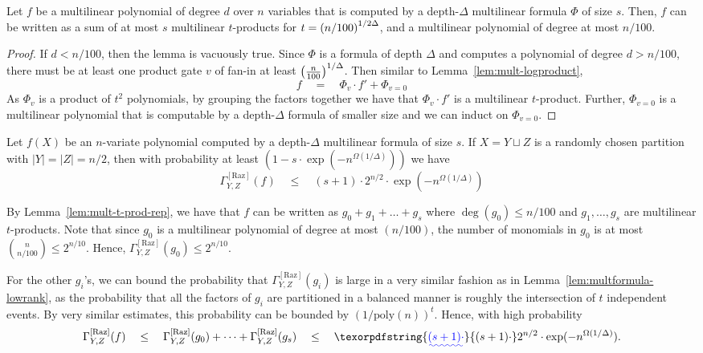 \documentclass{birkjour}
\newcommand{\CM}[1]{\Gamma^{\mathrm{[#1]}}}
\newcommand{\spaced}[1]{\quad#1\quad}
\providecommand{\DIFaddtex}[1]{{\protect\color{blue}\uwave{#1}}} %
\providecommand{\DIFdeltex}[1]{{\protect\color{red}\sout{#1}}}                      %
\providecommand{\DIFaddbegin}{} %
\providecommand{\DIFaddend}{} %
\providecommand{\DIFdelbegin}{} %
\providecommand{\DIFdelend}{} %
\providecommand{\DIFadd}[1]{\texorpdfstring{\DIFaddtex{#1}}{#1}} %
\providecommand{\DIFdel}[1]{\texorpdfstring{\DIFdeltex{#1}}{}} %
\begin{document}
\begin{lemma}\label{lem:mult-t-prod-rep}
Let $f$ be a multilinear polynomial of degree $d$ over $n$ variables that is computed by a depth-$\Delta$ multilinear formula $\Phi$ of size $s$. Then, $f$ can be written as a sum of at most $s$ multilinear $t$-products for $t = \left(n/100\right)^{1/2\Delta}$, and a multilinear polynomial of degree at most $n/100$.  
\end{lemma}
\begin{proof}
If $d < n/100$, then the lemma is vacuously true. Since $\Phi$ is a formula of depth $\Delta$ and computes a polynomial of degree $d > n/100$, there must be at least one product gate $v$ of fan-in at least \DIFdelbegin \DIFdel{$\left(\frac{n}{100}\right)^{1/\Delta}$}\DIFdelend \DIFaddbegin \DIFadd{$\inparen{\frac{n}{100}}^{1/\Delta} = t^2$}\DIFaddend . Then similar to Lemma~\ref{lem:mult-logproduct}, 
$$
f \quad=\quad \Phi_v \cdot f'  + \Phi_{v=0}
$$
As $\Phi_v$ is a product of $t^2$ polynomials, by grouping the factors together we have that $\Phi_v \cdot f'$ is a multilinear $t$-product. Further, $\Phi_{v=0}$ is a multilinear polynomial that is computable by a depth-$\Delta$ formula of smaller size and we can induct on $\Phi_{v=0}$. 
\end{proof}

\begin{lemma}\label{lem:mult-const-depth-upper-bound}
Let $f(X)$ be an $n$-variate polynomial computed by a depth-$\Delta$ multilinear formula of size $s$. If $X = Y \sqcup Z$ is a randomly chosen partition with $|Y| = |Z| = n/2$, then with probability at least $(1 - s \cdot \exp({-n^{\Omega(1/\Delta)}}))$ we have
$$
\CM{Raz}_{Y,Z}(f) \quad\leq\quad (s+1) \cdot 2^{n/2} \cdot \exp(-n^{\Omega(1/\Delta)})
$$
\end{lemma}
\begin{proof-sketch}
By Lemma~\ref{lem:mult-t-prod-rep}, we have that $f$ can be written as $g_0 + g_1 + \dots + g_s$ where $\deg(g_0) \leq n/100$ and $g_1,\dots, g_s$ are multilinear $t$-products. Note that since $g_0$ is a multilinear polynomial of degree at most $(n/100)$, the number of monomials in $g_0$ is at most $\binom{n}{n/100} \leq 2^{n/10}$. Hence, $\CM{Raz}_{Y,Z}(g_0) \leq 2^{n/10}$. 

For the other $g_i$'s, we can bound the probability that $\CM{Raz}_{Y,Z}(g_i)$ is large in a very similar fashion as in Lemma~\ref{lem:multformula-lowrank}, as the probability that all the factors of $g_i$ are partitioned in a balanced manner is roughly the intersection of $t$ independent events. By very similar estimates, this probability can be bounded by $(1/\mathrm{poly}(n))^t$. Hence, with high probability 
$$
\CM{Raz}_{Y,Z}(f) \spaced{\leq} \CM{Raz}_{Y,Z}(g_0) + \dots + \CM{Raz}_{Y,Z}(g_s) \spaced{\leq} \DIFaddbegin \DIFadd{(s+1)\cdot }\DIFaddend 2^{n/2} \cdot \exp(-n^{\Omega(1/\Delta)}).
$$
\end{proof-sketch}
\end{document}

